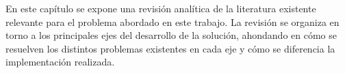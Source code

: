En este capítulo se expone una revisión analítica de la literatura existente relevante para el problema abordado en este trabajo. La revisión se organiza en torno a los principales ejes del desarrollo de la solución, ahondando en cómo se resuelven los distintos problemas existentes en cada eje y cómo se diferencia la implementación realizada.